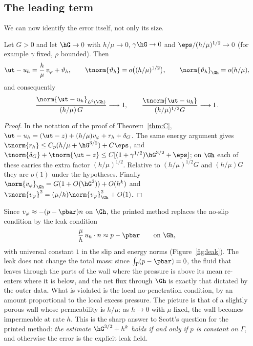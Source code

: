 \subsection{The leading term}
We can now identify the error itself, not only its size.

\begin{corollary}\label{cor:Bp}
Let $G>0$ and let $\hG\to0$ with $h/\mu\to0$, $\gamma\hG\to0$ and $\eps/(h/\mu)^{1/2}\to0$ (for example $\gamma$ fixed, $\rho$ bounded). Then
\[
\ut-u_h=\frac h\mu\,v_\varphi+\vartheta_h,\qquad \tnorm{\vartheta_h}=o\bigl((h/\mu)^{1/2}\bigr),\qquad \norm{\vartheta_h}_{\Gh}=o(h/\mu),
\]
and consequently
\[
\frac{\norm{\ut-u_h}_{L^2(\Gh)}}{(h/\mu)\,G}\longrightarrow1,\qquad\frac{\tnorm{\ut-u_h}}{(h/\mu)^{1/2}G}\longrightarrow1 .
\]
\end{corollary}

\begin{proof}
In the notation of the proof of Theorem~\ref{thm:C}, $\ut-u_h=(\ut-z)+(h/\mu)v_\varphi+r_h+\delta_G$. The same energy argument gives $\tnorm{r_h}\le C_p(h/\mu+\hG^{3/2})+C\eps$, and $\tnorm{\delta_G}+\tnorm{\ut-z}\le C[(1+\gamma^{1/2})\hG^{3/2}+\eps]$; on $\Gh$ each of these carries the extra factor $(h/\mu)^{1/2}$. Relative to $(h/\mu)^{1/2}G$ and $(h/\mu)G$ they are $o(1)$ under the hypotheses. Finally $\norm{v_\varphi}_{\Gh}=G(1+O(\hG^2))+O(h^k)$ and $\tnorm{v_\varphi}^2=(\mu/h)\norm{v_\varphi}^2_{\Gh}+O(1)$.
\end{proof}

Since $v_\varphi\approx-(p-\pbar)n$ on $\Gh$, the printed method replaces the no-slip condition by the leak condition
\[
\frac\mu h\,u_h\cdot n\approx p-\pbar\qquad\text{on }\Gh,
\]
with universal constant $1$ in the slip and energy norms (Figure~\ref{fig:leak}). The leak does not change the total mass: since $\int_\Gamma(p-\pbar)=0$, the fluid that leaves through the parts of the wall where the pressure is above its mean re-enters where it is below, and the net flux through $\Gh$ is exactly that dictated by the outer data. What is violated is the local no-penetration condition, by an amount proportional to the local excess pressure. The picture is that of a slightly porous wall whose permeability is $h/\mu$; as $h\to0$ with $\mu$ fixed, the wall becomes impermeable at rate $h$. This is the sharp answer to Scott's question for the printed method: \emph{the estimate $\hG^{3/2}+h^k$ holds if and only if $p$ is constant on $\Gamma$}, and otherwise the error is the explicit leak field.


